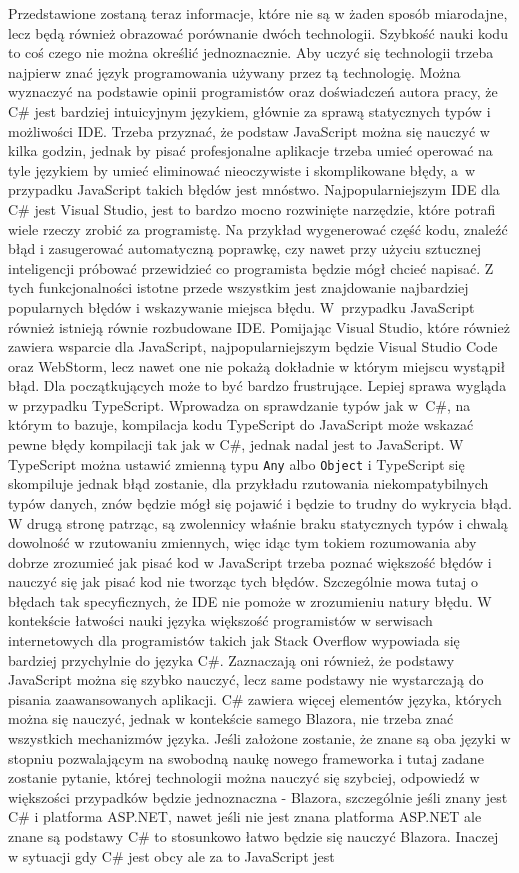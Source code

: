 \documentclass[12pt,a4paper,oneside]{book}
\begin{document}
Przedstawione zostaną teraz informacje, które nie są w żaden sposób miarodajne, lecz będą również obrazować porównanie dwóch technologii. Szybkość nauki kodu to coś czego nie można określić jednoznacznie. Aby uczyć się technologii trzeba najpierw znać język programowania używany przez tą technologię. Można wyznaczyć na podstawie opinii programistów oraz doświadczeń autora pracy, że C\# jest bardziej intuicyjnym językiem, głównie za sprawą statycznych typów i możliwości IDE. Trzeba przyznać, że podstaw JavaScript można się nauczyć w kilka godzin, jednak by pisać profesjonalne aplikacje trzeba umieć operować na tyle językiem by umieć eliminować nieoczywiste i skomplikowane błędy, a~w przypadku JavaScript takich błędów jest mnóstwo. Najpopularniejszym IDE dla C\# jest Visual Studio, jest to bardzo mocno rozwinięte narzędzie, które potrafi wiele rzeczy zrobić za programistę. Na przykład wygenerować część kodu, znaleźć błąd i zasugerować automatyczną poprawkę, czy nawet przy użyciu sztucznej inteligencji próbować przewidzieć co programista będzie mógł chcieć napisać. Z tych funkcjonalności istotne przede wszystkim jest znajdowanie najbardziej popularnych błędów i wskazywanie miejsca błędu. W~przypadku JavaScript również istnieją równie rozbudowane IDE. Pomijając Visual Studio, które również zawiera wsparcie dla JavaScript, najpopularniejszym będzie Visual Studio Code oraz WebStorm, lecz nawet one nie pokażą dokładnie w którym miejscu wystąpił błąd. Dla początkujących może to być bardzo frustrujące. Lepiej sprawa wygląda w przypadku TypeScript. Wprowadza on sprawdzanie typów jak w~C\#, na którym to bazuje, kompilacja kodu TypeScript do JavaScript może wskazać pewne błędy kompilacji tak jak w C\#, jednak nadal jest to JavaScript. W TypeScript można ustawić zmienną typu \texttt{Any} albo \texttt{Object} i TypeScript się skompiluje jednak błąd zostanie, dla przykładu rzutowania niekompatybilnych typów danych, znów będzie mógł się pojawić i będzie to trudny do wykrycia błąd. W drugą stronę patrząc, są zwolennicy właśnie braku statycznych typów i chwalą dowolność w rzutowaniu zmiennych, więc idąc tym tokiem rozumowania aby dobrze zrozumieć jak pisać kod w JavaScript trzeba poznać większość błędów i nauczyć się jak pisać kod nie tworząc tych błędów. Szczególnie mowa tutaj o błędach tak specyficznych, że IDE nie pomoże w zrozumieniu natury błędu. W kontekście łatwości nauki języka większość programistów w serwisach internetowych dla programistów takich jak Stack Overflow wypowiada się bardziej przychylnie do języka C\#. Zaznaczają oni również, że podstawy JavaScript można się szybko nauczyć, lecz same podstawy nie wystarczają do pisania zaawansowanych aplikacji. C\# zawiera więcej elementów języka, których można się nauczyć, jednak w kontekście samego Blazora, nie trzeba znać wszystkich mechanizmów języka. Jeśli założone zostanie, że znane są oba języki w stopniu pozwalającym na swobodną naukę nowego frameworka i tutaj zadane zostanie pytanie, której technologii można nauczyć się szybciej, odpowiedź w większości przypadków będzie jednoznaczna - Blazora, szczególnie jeśli znany jest C\# i platforma ASP.NET, nawet jeśli nie jest znana platforma ASP.NET ale znane są podstawy C\# to stosunkowo łatwo będzie się nauczyć Blazora. Inaczej w sytuacji gdy C\# jest obcy ale za to JavaScript jest 
\end{document}
